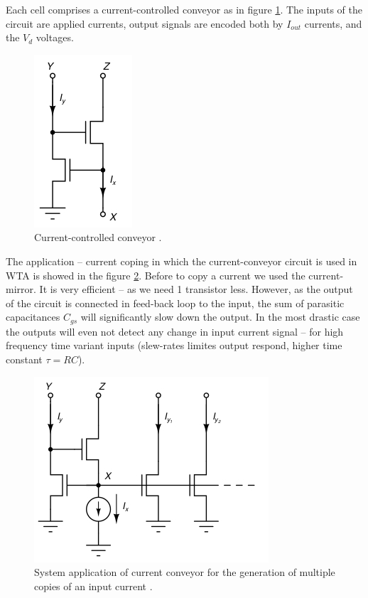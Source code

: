 \documentclass[main]{subfiles}
\begin{document}
Each cell comprises a current-controlled conveyor as in figure \ref{fig:current_conveyor}. The inputs of the circuit are applied currents,
output signals are encoded both by $I_{out}$ currents, and the $V_d$ voltages. 

\begin{figure}[htbp]
  \centering
  \includegraphics[scale=0.8]{pics/current_conveyor.jpg}
  \caption{Current-controlled conveyor \cite{book:VLSI}.}
  \label{fig:current_conveyor}
\end{figure} 

The application -- current coping in which the current-conveyor circuit is used in WTA is showed in the figure \ref{fig:current_conveyor_application}. Before to copy a current we used the current-mirror. It is very efficient -- as we need 1 transistor less. However, as the output of the circuit is connected in feed-back loop to the input, the sum of parasitic capacitances $C_{gs}$ will significantly slow down the output. In the most drastic case the outputs will even not detect any change in input current signal -- for high frequency time variant inputs (slew-rates limites output respond, higher time constant $\tau = RC$).

\begin{figure}[htbp]
  \centering
  \includegraphics[scale=0.8]{pics/current_conveyor_application.jpg}
  \caption{System application of current conveyor for the generation of multiple copies of an input current \cite{book:VLSI}.}
  \label{fig:current_conveyor_application}
\end{figure} 
\end{document}
